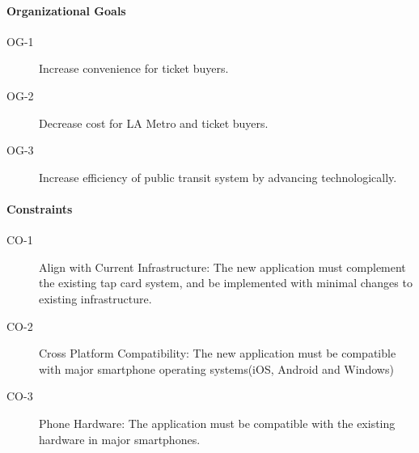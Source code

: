 




\paragraph{Organizational Goals}\begin{description}
	\item[OG-1] Increase convenience for ticket buyers.
	\item[OG-2] Decrease cost for LA Metro and ticket buyers. 
	\item[OG-3] Increase efficiency of public transit system by advancing technologically.
\end{description}

\paragraph{Constraints}\begin{description}
	\item[CO-1] Align with Current Infrastructure: The new application must complement the existing tap card system, and be implemented with minimal changes to existing infrastructure. 
	\item[CO-2] Cross Platform Compatibility: The new application must be compatible with major smartphone operating systems(iOS, Android and Windows)
	\item[CO-3] Phone Hardware: The application must be compatible with the existing hardware in major smartphones.

\end{description}